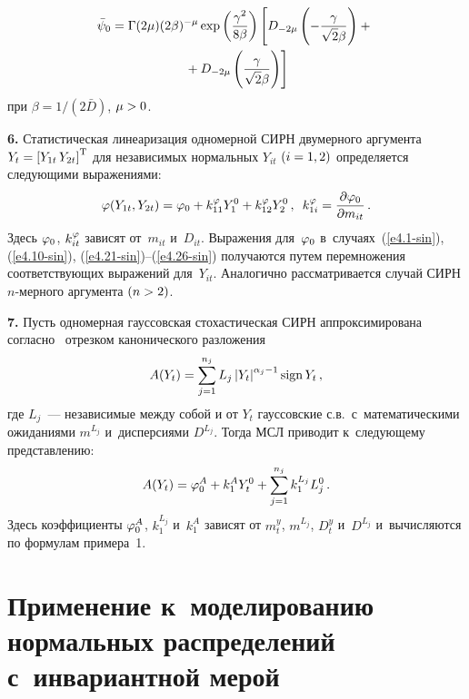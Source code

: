 \begin{multicols}{2}
\vspace*{-12pt}

   \noindent
   \begin{multline}
\bar\psi_0 = \Gamma (2\mu) (2\beta)^{-\mu} \exp \left(
\displaystyle\frac{\displaystyle \gamma^2\mathstrut}{\displaystyle 8\beta\mathstrut}\right) \left[ D_{-2\mu} \left( -\displaystyle\frac{\displaystyle \gamma\mathstrut}{\displaystyle \sqrt{2}\beta\mathstrut}\right) +{}\right.\\
\left.{}+ D_{-2\mu}  \left( \displaystyle\frac{\displaystyle \gamma\mathstrut}{\displaystyle \sqrt{2}\beta\mathstrut}\right) \right]
\label{e4.26-sin}
\end{multline}
при
$\beta ={1}/({2 \bar{D}})$, $\mu\hm>0$.



\textbf{6.}
Статистическая линеаризация одномерной СИРН двумерного аргумента
$Y_t\hm=\lk Y_{1t} \, Y_{2t}\rk^{\mathrm{T}}$ для независимых нормальных $Y_{it}$
$(i\hm=1,2)$ определяется следующими выражениями:
\begin{equation*}
\vrp (Y_{1t}, Y_{2t}) =\vrp_0 + k_{11}^\vrp Y_1^0 +
k_{12}^\vrp Y_2^0\,,\enskip k_{1i}^\vrp =\fr{\prt \vrp_0}
{\prt m_{it}}\,. %
\end{equation*}
Здесь $\varphi_0$, $k_{it}^\varphi$ зависят от~$m_{it}$
и~$D_{it}$. Выражения для~$\varphi_0$ в~случаях~(\ref{e4.1-sin}), (\ref{e4.10-sin}),
(\ref{e4.21-sin})--(\ref{e4.26-sin}) получаются путем перемножения
соответствующих выражений для~$Y_{it}$. Аналогично рассматривается случай СИРН
$n$-мер\-но\-го аргумента $(n\hm>2)$.

\textbf{7.}
Пусть одномерная гауссовская стохастическая СИРН аппроксимирована
согласно~\cite{3-sin} отрезком канонического разложения
\begin{equation*}
A(Y_t) =\sss\limits_{j=1}^{n_j} L_j \left\vert Y_t\right\vert^{\alpha_j -1}
\mathrm{sign}\, Y_t\,, %
\end{equation*}
где $L_j$~--- независимые между собой и от $Y_t$ гауссовские с.в.\
с~математическими ожиданиями $m^{L_j}$ и~дисперсиями $D^{L_j}$. Тогда
МСЛ приводит к~сле\-ду\-юще\-му представлению:
\begin{equation*}
A(Y_t) = \varphi_0^A + k_1^A Y_t^0 +\sum\limits\limits_{j=1}^{n_j} k_1^{L_j} L_j^0\,.
\end{equation*}
Здесь коэффициенты $\varphi_0^A$, $k_1^{L_j}$ и~$k_1^A$ зависят
от $m_t^y$, $m^{L_j}$, $D_t^y$ и~$D^{L_j}$ и~вычисляются по формулам примера~1.


\section{Применение к~моделированию нормальных распределений с~инвариантной мерой}


\end{multicols}
